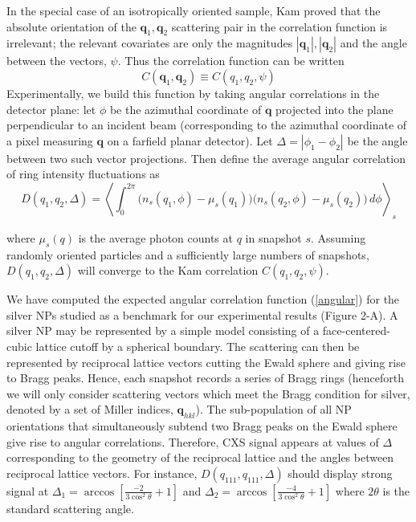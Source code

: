 \documentclass [11pt,fleqn]{article}
\def \be {\begin{equation}}
\def \ee {\end{equation}}
\begin{document}
In the special case of an isotropically oriented sample, Kam proved that the absolute orientation of the $\bm q_1, \bm q_2$ scattering pair in the correlation function is irrelevant; the relevant covariates are only the magnitudes $| \bm q_1 | , | \bm q_2 | $ and the angle between the vectors, $\psi$. Thus the correlation function can be written 
\[
C(\bm q_1, \bm q_2)  \equiv C (q_1,q_2, \psi  )
\]
Experimentally, we build this function by taking angular correlations in the detector plane: let $\phi$ be the azimuthal coordinate of $\bm q$ projected into the plane perpendicular to an incident beam (corresponding to the azimuthal coordinate of a pixel measuring $\bm q$ on a farfield planar detector). Let $\Delta = |\phi_{1} - \phi_{2}|$ be the angle between two such vector projections. Then define the average angular correlation of ring intensity fluctuations as
\be \label{angular}
D (q_1,q_2, \Delta  ) = \left \langle \int_{0}^{2\pi}  \Big ( n_s(q_1,\phi) -   \mu_s( q_1) \Big) \Big ( n_s(q_2,\phi) -   \mu_s( q_2) \Big)  \, d\phi  \right \rangle_{s}
\ee

where $\mu_s( q)$ is the average photon counts at $q$ in snapshot $s$. Assuming randomly oriented particles and a sufficiently large numbers of snapshots, $D (q_1,q_2, \Delta  )$ will converge to the Kam correlation $C (q_1,q_2, \psi  )$.

We have computed the expected angular correlation function (\ref{angular}) for the silver NPs studied as a benchmark for our experimental results (Figure 2-A). A silver NP may be represented by a simple model consisting of a face-centered-cubic lattice cutoff by a spherical boundary. The scattering can then be represented by reciprocal lattice vectors cutting the Ewald sphere and giving rise to Bragg peaks. Hence, each snapshot records a series of Bragg rings (henceforth we will only consider scattering vectors which meet the Bragg condition for silver, denoted by a set of Miller indices, $\bm q_{hkl}$). The sub-population of all NP orientations that simultaneously subtend two Bragg peaks on the Ewald sphere give rise to angular correlations. Therefore,  CXS signal appears at values of $\Delta $ corresponding to the geometry of the reciprocal lattice and the angles between reciprocal lattice vectors. For instance, $D (q_{111},q_{111}, \Delta  )$ should display strong signal at $\Delta_1 = \arccos[ \frac{-2}{3\cos^{2}\theta} + 1  ]$ and $\Delta_2 = \arccos[ \frac{-4}{3\cos^{2}\theta} + 1  ]$ where $2\theta$ is the standard scattering angle.
\end{document}
